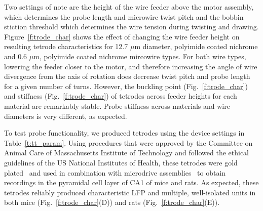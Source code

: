 \documentclass[11pt,a4paper]{article}
\begin{document}
Two settings of note are the height of the wire feeder above the motor
assembly, which determines the probe length and microwire twist pitch and the
bobbin stiction threshold which determines the wire tension during twisting and
drawing. Figure~\ref{f:trode_char} shows the effect of changing the wire
feeder height on resulting tetrode characteristics for 12.7 $\mu$m diameter,
polyimide coated nichrome and 0.6 $\mu$m, polyimide coated nichrome mircowire
types. For both wire types, lowering the feeder closer to the motor, and
therefore increasing the angle of wire divergence from the axis of rotation
does decrease twist pitch and probe length for a given number of turns.
However, the buckling point (Fig.~\ref{f:trode_char}) and stiffness
(Fig.~\ref{f:trode_char}) of tetrodes across feeder heights for each material
are remarkably stable. Probe stiffness across materials and wire diameters is
very different, as expected.

To test probe functionality, we produced tetrodes using the device settings in
Table~\ref{t:tt_param}. Using procedures that were approved by the
Committee on Animal Care of Massachusetts Institute of Technology and followed
the ethical guidelines of the US National Institutes of Health, these tetrodes
were gold plated~\cite{Nguyen2009} and used in combination with microdrive
assemblies~\cite{Voigts2013,Kloosterman2009} to obtain recordings in the
pyramidal cell layer of CA1 of mice and rats. As expected, these tetrodes
reliably produced characteristic LFP and multiple, well-isolated units in both
mice (Fig.~\ref{f:trode_char}(D)) and rats (Fig.~\ref{f:trode_char}(E)).
\end{document}
